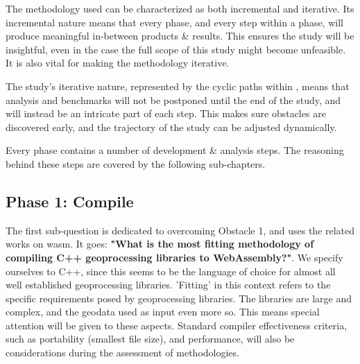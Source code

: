 The methodology used can be characterized as both incremental and iterative. Its incremental nature means that every phase, and every step within a phase, will produce meaningful in-between products \& results. This ensures the study will be insightful, even in the case the full scope of this study might become unfeasible. It is also vital for making the methodology iterative. 

The study's iterative nature, represented by the cyclic paths within , means that analysis and benchmarks will not be postponed until the end of the study, and will instead be an intricate part of each step. This makes sure obstacles are discovered early, and the trajectory of the study can be adjusted dynamically.  

Every phase contains a number of development \& analysis steps. The reasoning behind these steps are covered by the following sub-chapters.  


\subsection{Phase 1: Compile}


The first sub-question is dedicated to overcoming Obstacle 1, and uses the related works on \ac{wasm}. It goes: \textbf{"What is the most fitting methodology of compiling C++ geoprocessing libraries to WebAssembly?"}.
We specify ourselves to C++, since this seems to be the language of choice for almost all well established geoprocessing libraries. 
'Fitting' in this context refers to the specific requirements posed by geoprocessing libraries. 
The libraries are large and complex, and the geodata used as input even more so. 
This means special attention will be given to these aspects. 
Standard compiler effectiveness criteria, such as portability (smallest file size), and performance, will also be considerations during the assessment of methodologies.  

